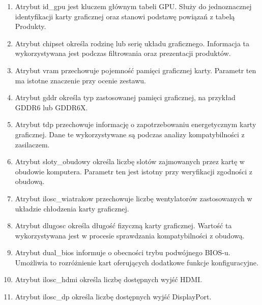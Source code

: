 \documentclass[a4paper,twoside,12pt]{book}
\begin{document}
\begin{enumerate}
    \item Atrybut id\_gpu jest kluczem głównym tabeli GPU. Służy do jednoznacznej
    identyfikacji karty graficznej oraz stanowi podstawę powiązań z tabelą
    Produkty.

    \item Atrybut chipset określa rodzinę lub serię układu graficznego. Informacja
    ta wykorzystywana jest podczas filtrowania oraz prezentacji produktów.

    \item Atrybut vram przechowuje pojemność pamięci graficznej karty. Parametr ten
    ma istotne znaczenie przy ocenie zestawu.

    \item Atrybut gddr określa typ zastosowanej pamięci graficznej, na przykład
    GDDR6 lub GDDR6X.

    \item Atrybut tdp przechowuje informację o zapotrzebowaniu energetycznym karty
    graficznej. Dane te wykorzystywane są podczas analizy kompatybilności z
    zasilaczem.

    \item Atrybut sloty\_obudowy określa liczbę slotów zajmowanych przez kartę w
    obudowie komputera. Parametr ten jest istotny przy weryfikacji zgodności z
    obudową.

    \item Atrybut ilosc\_wiatrakow przechowuje liczbę wentylatorów zastosowanych w
    układzie chłodzenia karty graficznej.

    \item Atrybut dlugosc określa długość fizyczną karty graficznej. Wartość ta
    wykorzystywana jest w procesie sprawdzania kompatybilności z obudową.

    \item Atrybut dual\_bios informuje o obecności trybu podwójnego BIOS-u.
    Umożliwia to rozróżnienie kart oferujących dodatkowe funkcje konfiguracyjne.

    \item Atrybut ilosc\_hdmi określa liczbę dostępnych wyjść HDMI.

    \item Atrybut ilosc\_dp określa liczbę dostępnych wyjść DisplayPort.
\end{enumerate}

\newpage 
\end{document}
